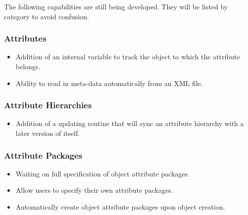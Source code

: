 %

The following capabilities are still being developed.  They will be listed by category to avoid confusion.
 
\subsubsection{Attributes}

\begin{itemize}
\item Addition of an internal variable to track the object to which the attribute belongs.
\item Ability to read in meta-data automatically from an XML file.
\end{itemize}

\subsubsection{Attribute Hierarchies}

\begin{itemize}
\item Addition of a updating routine that will sync an attribute hierarchy with a later version of itself.
\end{itemize}

\subsubsection{Attribute Packages}

\begin{itemize}
\item Waiting on full specification of object attribute packages.
\item Allow users to specify their own attribute packages.
\item Automatically create object attribute packages upon object creation.
\end{itemize}